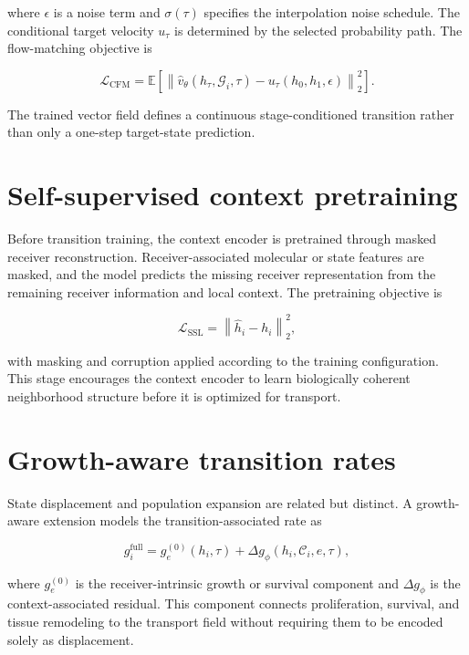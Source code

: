 where $\epsilon$ is a noise term and $\sigma(\tau)$ specifies the interpolation noise schedule. The conditional target velocity $u_{\tau}$ is determined by the selected probability path. The flow-matching objective is

\begin{equation}
\mathcal{L}_{\mathrm{CFM}}
=
\mathbb{E}
\left[
\left\|
\hat{v}_{\theta}(h_{\tau},\mathcal{G}_i,\tau)
-
u_{\tau}(h_0,h_1,\epsilon)
\right\|_2^2
\right].
\label{eq:cfm}
\end{equation}

The trained vector field defines a continuous stage-conditioned transition rather than only a one-step target-state prediction.

\section{Self-supervised context pretraining}

Before transition training, the context encoder is pretrained through masked receiver reconstruction. Receiver-associated molecular or state features are masked, and the model predicts the missing receiver representation from the remaining receiver information and local context. The pretraining objective is

\begin{equation}
\mathcal{L}_{\mathrm{SSL}}
=
\left\|
\hat{h}_i-h_i
\right\|_2^2,
\end{equation}

with masking and corruption applied according to the training configuration. This stage encourages the context encoder to learn biologically coherent neighborhood structure before it is optimized for transport.

\section{Growth-aware transition rates}

State displacement and population expansion are related but distinct. A growth-aware extension models the transition-associated rate as

\begin{equation}
g_i^{\mathrm{full}}
=
g_e^{(0)}(h_i,\tau)
+
\Delta g_{\phi}(h_i,\mathcal{C}_i,e,\tau),
\end{equation}

where $g_e^{(0)}$ is the receiver-intrinsic growth or survival component and $\Delta g_{\phi}$ is the context-associated residual. This component connects proliferation, survival, and tissue remodeling to the transport field without requiring them to be encoded solely as displacement.


